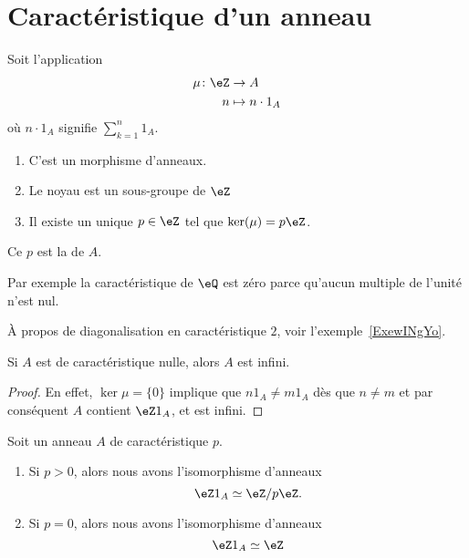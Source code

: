 \section{Caractéristique d'un anneau}

\begin{lemmaDef}        \label{LEMDEFooVEWZooUrPaDw}
	Soit l'application
	\begin{equation}
		\begin{aligned}
			\mu\colon \eZ & \to A              \\
			n             & \mapsto n\cdot 1_A
		\end{aligned}
	\end{equation}
	où \( n\cdot 1_A\) signifie \( \sum_{k=1}^n1_A\).
	\begin{enumerate}
		\item
		      C'est un morphisme d'anneaux.
		\item
		      Le noyau est un sous-groupe de \( \eZ\)
		\item
		      Il existe un unique \( p\in \eZ\) tel que \( \ker(\mu)=p\eZ\).
	\end{enumerate}
	Ce \( p\) est la  de \( A\).
\end{lemmaDef}

Par exemple la caractéristique de \( \eQ\) est zéro parce qu'aucun multiple de l'unité n'est nul.

À propos de diagonalisation en caractéristique \( 2\), voir l'exemple~\ref{ExewINgYo}.

\begin{lemma}
	Si \( A\) est de caractéristique nulle, alors \( A\) est infini.
\end{lemma}

\begin{proof}
	En effet, \( \ker\mu=\{0\} \) implique que \( n1_A \neq  m1_A\) dès que \(n \neq m \) et par conséquent \( A\) contient \(\eZ 1_A \), et  est infini.
\end{proof}

\begin{lemma}       \label{LemHmDaYH}
	Soit un anneau \( A\) de caractéristique \( p\).
	\begin{enumerate}
		\item       \label{ITEMooPKSEooPKChGM}
		      Si \( p>0\), alors nous avons l'isomorphisme d'anneaux
		      \begin{equation}
			      \eZ 1_A\simeq\eZ/p\eZ.
		      \end{equation}
		\item        \label{ITEMooBTUIooYzOycc}
		      Si \( p=0\), alors nous avons l'isomorphisme d'anneaux
		      \begin{equation}
			      \eZ 1_A\simeq \eZ
		      \end{equation}
	\end{enumerate}
\end{lemma}

